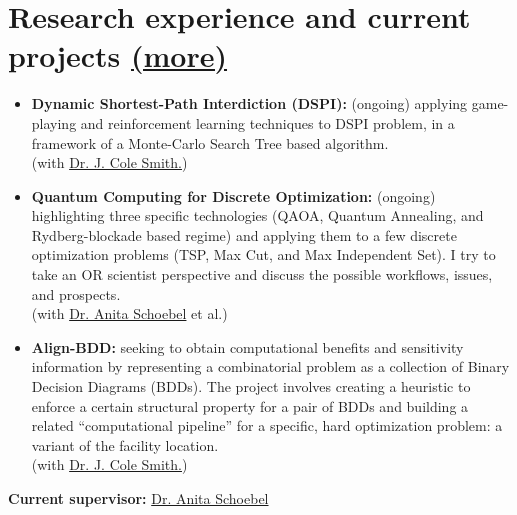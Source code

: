 \documentclass[11pt, a4paper]{article} \usepackage{geometry} %
\newcommand{\mhref}[1]{\hfill\href{#1}{\small (more\faExternalLink*)}}
\begin{document}
  \section*{Research experience and current projects \mhref{https://www.bochkarev.io/research/}}
  \begin{itemize}
    \itemsep0pt
    \item \textbf{Dynamic Shortest-Path Interdiction (DSPI):} (ongoing) applying
          game-playing and reinforcement learning techniques to DSPI problem, in
          a framework of a Monte-Carlo Search Tree based algorithm.
          \\(with
          \href{https://scholar.google.com/citations?user=87CaUHYAAAAJ&hl=en}{Dr.
          J. Cole Smith.})
    \item \textbf{Quantum Computing for Discrete Optimization:} (ongoing)
          highlighting three specific technologies (QAOA, Quantum Annealing, and
          Rydberg-blockade based regime) and applying them to a few discrete
          optimization problems (TSP, Max Cut, and Max Independent Set). I try
          to take an OR scientist perspective and discuss the possible
          workflows, issues, and prospects.
          \\(with
          \href{https://scholar.google.com/citations?user=yYeHbcIAAAAJ&hl=en}{Dr.
          Anita Schoebel} et al.)
    \item \textbf{Align-BDD:} seeking to obtain computational benefits and
          sensitivity information by representing a combinatorial problem as a
          collection of Binary Decision Diagrams (BDDs). The project involves
          creating a heuristic to enforce a certain structural property for a
          pair of BDDs and building a related ``computational pipeline'' for a
          specific, hard optimization problem: a variant of the facility
          location.
          \\(with
          \href{https://scholar.google.com/citations?user=87CaUHYAAAAJ&hl=en}{Dr.
          J. Cole Smith.})
  \end{itemize} \vspace{0.5em}

  \noindent\textbf{Current supervisor:} \href{https://scholar.google.com/citations?user=yYeHbcIAAAAJ&hl=en}{Dr.
          Anita Schoebel}
  \vspace{1.5em}
\end{document}
